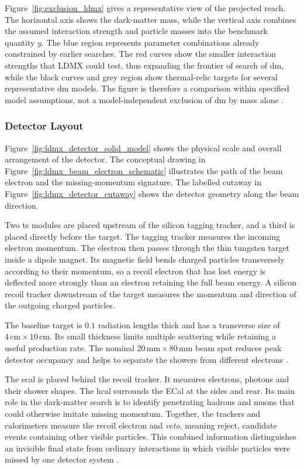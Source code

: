 Figure~\ref{fig:exclusion_ldmx} gives a representative view of the projected
reach. The horizontal axis shows the dark-matter mass, while the vertical
axis combines the assumed interaction strength and particle masses into the
benchmark quantity \(y\). The blue region represents parameter combinations
already constrained by earlier searches. The red curves show the smaller
interaction strengths that LDMX could test, thus expanding the frontier of 
search of \gls{dm}, while the black curves and grey
region show thermal-relic targets for several representative \gls{dm}
models. The figure is therefore a comparison within specified model
assumptions, not a model-independent exclusion of \gls{dm} by mass alone
\cite{akesson2022-ldmx-status,catena2023-spin1-thermal-targets,
ldmx2025-overview}.

\subsubsection{Detector Layout}

Figure~\ref{fig:ldmx_detector_solid_model} shows the physical scale and
overall arrangement of the detector. The conceptual drawing in
Figure~\ref{fig:ldmx_beam_electron_schematic} illustrates the path of the
beam electron and the missing-momentum signature. The labelled cutaway in
Figure~\ref{fig:ldmx_detector_cutaway} shows the detector geometry along the
beam direction.

Two \gls{ts} modules are placed upstream of the silicon tagging tracker, and
a third is placed directly before the target. The tagging tracker measures
the incoming electron momentum. The electron then passes through the thin
tungsten target inside a dipole magnet. Its magnetic field bends charged
particles transversely according to their momentum, so a recoil electron
that has lost energy is deflected more strongly than an electron retaining
the full beam energy. A silicon recoil tracker downstream of the target
measures the momentum and direction of the outgoing charged particles.

The baseline target is \(0.1\) radiation lengths thick and has a transverse
size of \(4\,\mathrm{cm}\times10\,\mathrm{cm}\). Its small thickness limits
multiple scattering while retaining a useful production rate. The nominal
\(20\,\mathrm{mm}\times80\,\mathrm{mm}\) beam spot reduces peak detector
occupancy and helps to separate the showers from different electrons
\cite{ldmx2025-overview}.

The \gls{ecal} is placed behind the recoil tracker. It measures electrons,
photons and their shower shapes. The \gls{hcal} surrounds the ECal at the sides
and rear. Its main role in the dark-matter search is to identify penetrating
hadrons and muons that could otherwise imitate missing momentum. Together,
the trackers and calorimeters measure the recoil electron and \emph{veto},
meaning reject, candidate events containing other visible particles. This
combined information distinguishes an invisible final state from ordinary
interactions in which visible particles were missed by one detector system
\cite{ldmx2025-overview}.

